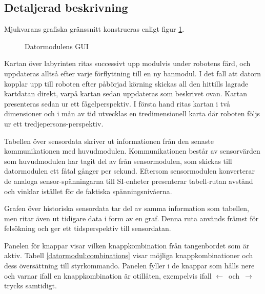 \documentclass[11pt]{article}
\begin{document}
\begin{flushleft}
\subsection{Detaljerad beskrivning}
Mjukvarans grafiska gränssnitt konstrueras enligt figur \ref{datormodul:software}.

\begin{figure}[htbp]
\centering
\noindent\resizebox{.5\linewidth}{!}{
	}
	\caption{Datormodulens GUI \label{datormodul:software}}	
\end{figure}

Kartan över labyrinten ritas successivt upp modulvis under robotens färd, och uppdateras alltså efter varje förflyttning till en ny banmodul. I det fall att datorn kopplar upp till roboten efter påbörjad körning skickas all den hittills lagrade kartdatan direkt, varpå kartan sedan uppdateras som beskrivet ovan. Kartan presenteras sedan ur ett fågelperspektiv. I första hand ritas kartan i två dimensioner och i mån av tid utvecklas en tredimensionell karta där roboten följs ur ett tredjepersons-perspektiv. 

Tabellen över sensordata skriver ut informationen från den senaste kommunikationen med huvudmodulen. Kommunikationen består av sensorvärden som huvudmodulen har tagit del av från sensormodulen, som skickas till datormodulen ett fåtal gånger per sekund. Eftersom sensormodulen konverterar de analoga sensor-spänningarna till SI-enheter presenterar tabell-rutan avstånd och vinklar istället för de faktiska spänningsnivåerna. 

Grafen över historiska sensordata tar del av samma information som tabellen, men ritar även ut tidigare data i form av en graf. Denna ruta används främst för felsökning och ger ett tidsperspektiv till sensordatan.

Panelen för knappar visar vilken knappkombination från tangenbordet som är aktiv. Tabell \ref{datormodul:combinations} visar möjliga knappkombinationer och dess översättning till styrkommando. Panelen fyller i de knappar som hålls nere och varnar ifall en knappkombination är otillåten, exempelvis ifall \mbox{$\leftarrow$ och $\rightarrow$} trycks samtidigt.


\end{flushleft}
\end{document}
